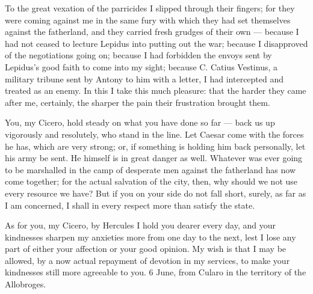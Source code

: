  To the great vexation of the parricides I slipped through their fingers; for they were coming against me in the same fury with which they had set themselves against the fatherland, and they carried fresh grudges of their own --- because I had not ceased to lecture Lepidus into putting out the war; because I disapproved of the negotiations going on; because I had forbidden the envoys sent by Lepidus's good faith to come into my sight; because C. Catius Vestinus, a military tribune sent by Antony to him with a letter, I had intercepted and treated as an enemy. In this I take this much pleasure: that the harder they came after me, certainly, the sharper the pain their frustration brought them.

 You, my Cicero, hold steady on what you have done so far --- back us up vigorously and resolutely, who stand in the line. Let Caesar come with the forces he has, which are very strong; or, if something is holding him back personally, let his army be sent. He himself is in great danger as well. Whatever was ever going to be marshalled in the camp of desperate men against the fatherland has now come together; for the actual salvation of the city, then, why should we not use every resource we have? But if you on your side do not fall short, surely, as far as I am concerned, I shall in every respect more than satisfy the state.

 As for you, my Cicero, by Hercules I hold you dearer every day, and your kindnesses sharpen my anxieties more from one day to the next, lest I lose any part of either your affection or your good opinion. My wish is that I may be allowed, by a now actual repayment of devotion in my services, to make your kindnesses still more agreeable to you. 6 June, from Cularo in the territory of the Allobroges.
